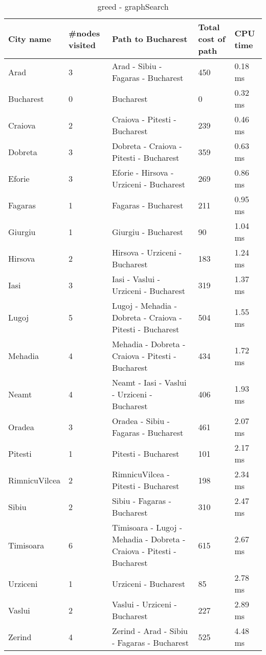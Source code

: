 \documentclass[a4paper]{article}
\begin{document}
\begin {table}[H]
\caption {greed - graphSearch}
\begin{center}
\begin{tabular}{ | l | l |  p{5cm} | l | l |} \hline
City name & \multicolumn{1}{l|}{\#nodes visited} & \multicolumn{1}{l|}{Path to Bucharest} & \multicolumn{1}{l|}{Total cost of path} & \multicolumn{1}{l|}{CPU time} \\ \hline
Arad & 3 & Arad - Sibiu - Fagaras - Bucharest & 450 & 0.18 ms \\ \hline
Bucharest & 0 & Bucharest & 0 & 0.32 ms \\ \hline
Craiova & 2 & Craiova - Pitesti - Bucharest & 239 & 0.46 ms \\ \hline
Dobreta & 3 & Dobreta - Craiova - Pitesti - Bucharest & 359 & 0.63 ms \\ \hline
Eforie & 3 & Eforie - Hirsova - Urziceni - Bucharest & 269 & 0.86 ms \\ \hline
Fagaras & 1 & Fagaras - Bucharest & 211 & 0.95 ms \\ \hline
Giurgiu & 1 & Giurgiu - Bucharest & 90 & 1.04 ms \\ \hline
Hirsova & 2 & Hirsova - Urziceni - Bucharest & 183 & 1.24 ms \\ \hline
Iasi & 3 & Iasi - Vaslui - Urziceni - Bucharest & 319 & 1.37 ms \\ \hline
Lugoj & 5 & Lugoj - Mehadia - Dobreta - Craiova - Pitesti - Bucharest & 504 & 1.55 ms \\ \hline
Mehadia & 4 & Mehadia - Dobreta - Craiova - Pitesti - Bucharest & 434 & 1.72 ms \\ \hline
Neamt & 4 & Neamt - Iasi - Vaslui - Urziceni - Bucharest & 406 & 1.93 ms \\ \hline
Oradea & 3 & Oradea - Sibiu - Fagaras - Bucharest & 461 & 2.07 ms \\ \hline
Pitesti & 1 & Pitesti - Bucharest & 101 & 2.17 ms \\ \hline
RimnicuVilcea & 2 & RimnicuVilcea - Pitesti - Bucharest & 198 & 2.34 ms \\ \hline
Sibiu & 2 & Sibiu - Fagaras - Bucharest & 310 & 2.47 ms \\ \hline
Timisoara & 6 & Timisoara - Lugoj - Mehadia - Dobreta - Craiova - Pitesti - Bucharest & 615 & 2.67 ms \\ \hline
Urziceni & 1 & Urziceni - Bucharest & 85 & 2.78 ms \\ \hline
Vaslui & 2 & Vaslui - Urziceni - Bucharest & 227 & 2.89 ms \\ \hline
Zerind & 4 & Zerind - Arad - Sibiu - Fagaras - Bucharest & 525 & 4.48 ms \\ \hline
\end{tabular}
\end{center}
\end {table}
\end{document}
